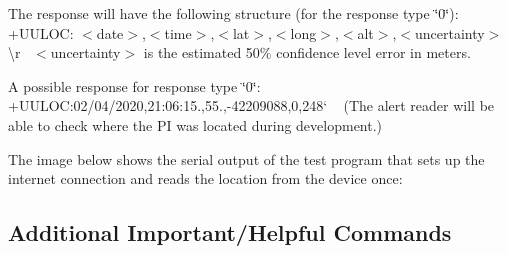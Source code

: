 The response will have the following structure (for the response type \char`\"{}0\char`\"{})\+:~\newline
 {\ttfamily +\+U\+U\+L\+OC\+: $<$date$>$,$<$time$>$,$<$lat$>$,$<$long$>$,$<$alt$>$,$<$uncertainty$>$\textbackslash{}r}~\newline
 {\ttfamily $<$uncertainty$>$} is the estimated 50\% confidence level error in meters. ~\newline


A possible response for response type \char`\"{}0\char`\"{}\+:~\newline
 {\ttfamily +\+U\+U\+L\+OC\+:}02/04/2020,21\+:06\+:15.,55.,-\/42209088,0,248` ~\newline
 (The alert reader will be able to check where the PI was located during development.)

The image below shows the serial output of the test program that sets up the internet connection and reads the location from the device once\+: 

 

\subsection*{Additional Important/\+Helpful Commands}

